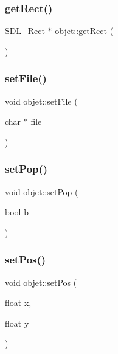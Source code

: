 \mbox{\label{classobjet_a0ea9eddbe8de1422f9d5100f1905f1b3}} 
\subsubsection{\texorpdfstring{get\+Rect()}{getRect()}}
{\footnotesize\ttfamily S\+D\+L\+\_\+\+Rect $\ast$ objet\+::get\+Rect (\begin{DoxyParamCaption}{ }\end{DoxyParamCaption})}

\mbox{\label{classobjet_a570029d148bc7cff4293561ae91c2c11}} 
\subsubsection{\texorpdfstring{set\+File()}{setFile()}}
{\footnotesize\ttfamily void objet\+::set\+File (\begin{DoxyParamCaption}\item[{char $\ast$}]{file }\end{DoxyParamCaption})}

\mbox{\label{classobjet_aedb6bb9d4a7fb03ff4b60a47afa22793}} 
\subsubsection{\texorpdfstring{set\+Pop()}{setPop()}}
{\footnotesize\ttfamily void objet\+::set\+Pop (\begin{DoxyParamCaption}\item[{bool}]{b }\end{DoxyParamCaption})}

\mbox{\label{classobjet_a62fef9f460ed7236684f6ddaaae4ce2c}} 
\subsubsection{\texorpdfstring{set\+Pos()}{setPos()}}
{\footnotesize\ttfamily void objet\+::set\+Pos (\begin{DoxyParamCaption}\item[{float}]{x,  }\item[{float}]{y }\end{DoxyParamCaption})}

